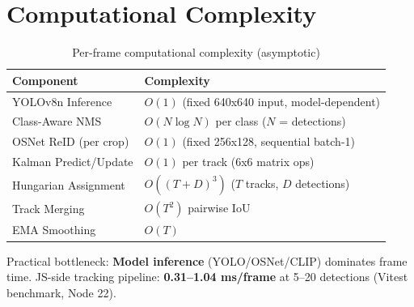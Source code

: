 \begin{center}
\end{center}

\section{Computational Complexity}
\label{sec:complexity}

\begin{table}[htbp]
\centering
\caption{Per-frame computational complexity (asymptotic)}
\label{tab:complexity}
\begin{tabular}{@{}ll@{}}
\toprule
\textbf{Component} & \textbf{Complexity} \\
\midrule
YOLOv8n Inference & $O(1)$ (fixed 640x640 input, model-dependent) \\
Class-Aware NMS & $O(N \log N)$ per class ($N$ = detections) \\
OSNet ReID (per crop) & $O(1)$ (fixed 256x128, sequential batch-1) \\
Kalman Predict/Update & $O(1)$ per track (6x6 matrix ops) \\
Hungarian Assignment & $O((T+D)^3)$ ($T$ tracks, $D$ detections) \\
Track Merging & $O(T^2)$ pairwise IoU \\
EMA Smoothing & $O(T)$ \\
\bottomrule
\end{tabular}
\end{table}

Practical bottleneck: \textbf{Model inference} (YOLO/OSNet/CLIP) dominates frame time. JS-side tracking pipeline: \textbf{0.31--1.04 ms/frame} at 5--20 detections (Vitest benchmark, Node 22).
